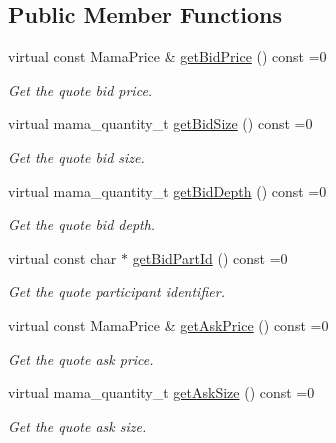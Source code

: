\subsection*{Public Member Functions}
\begin{CompactItemize}
\item 
virtual const Mama\-Price \& \hyperlink{classWombat_1_1MamdaQuoteUpdate_2abf6ec26cbedf5cddf77c8425353836}{get\-Bid\-Price} () const =0
\begin{CompactList}\small\item\em Get the quote bid price. \item\end{CompactList}\item 
virtual mama\_\-quantity\_\-t \hyperlink{classWombat_1_1MamdaQuoteUpdate_1e19e5cf2c0c7dcbaac8de68ced4da44}{get\-Bid\-Size} () const =0
\begin{CompactList}\small\item\em Get the quote bid size. \item\end{CompactList}\item 
virtual mama\_\-quantity\_\-t \hyperlink{classWombat_1_1MamdaQuoteUpdate_7b65c1e8843a0a42c422e26da7a22ef0}{get\-Bid\-Depth} () const =0
\begin{CompactList}\small\item\em Get the quote bid depth. \item\end{CompactList}\item 
virtual const char $\ast$ \hyperlink{classWombat_1_1MamdaQuoteUpdate_fb8009221e0d9b5094c6047d21326cc0}{get\-Bid\-Part\-Id} () const =0
\begin{CompactList}\small\item\em Get the quote participant identifier. \item\end{CompactList}\item 
virtual const Mama\-Price \& \hyperlink{classWombat_1_1MamdaQuoteUpdate_a56ea32dd2f84c636685ffd31137501b}{get\-Ask\-Price} () const =0
\begin{CompactList}\small\item\em Get the quote ask price. \item\end{CompactList}\item 
virtual mama\_\-quantity\_\-t \hyperlink{classWombat_1_1MamdaQuoteUpdate_4040feb7d514c900fa4a941607a11c0a}{get\-Ask\-Size} () const =0
\begin{CompactList}\small\item\em Get the quote ask size. \item\end{CompactList}\item 

\end{CompactItemize}
